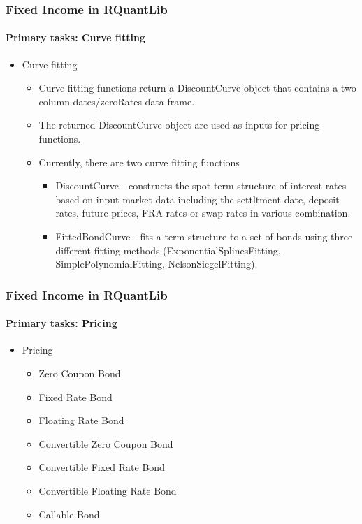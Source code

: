 \documentclass[smaller,compress]{beamer}
\begin{document}
\begin{frame}
	\frametitle{Fixed Income in RQuantLib}
	\framesubtitle{Primary tasks: Curve fitting}
	\begin{itemize}
		\item Curve fitting
			\begin{itemize}
				\item Curve fitting functions return a DiscountCurve object that contains a two column dates/zeroRates data frame.
				\item The returned DiscountCurve object are used as inputs for pricing functions. 
				\item Currently, there are two curve fitting functions
					\begin{itemize}
						\item DiscountCurve - constructs the spot term structure of interest rates based on input market data including the settltment date, deposit rates, future prices, FRA rates or swap rates in various combination.
						\item FittedBondCurve - fits a term structure to a set of bonds using three different fitting methods (ExponentialSplinesFitting, SimplePolynomialFitting, NelsonSiegelFitting).
					\end{itemize}
			\end{itemize}
	\end{itemize}
\end{frame}

\begin{frame}
	\frametitle{Fixed Income in RQuantLib}
	\framesubtitle{Primary tasks: Pricing}
	\begin{itemize}
		\item Pricing
			\begin{itemize}
				\item Zero Coupon Bond
				\item Fixed Rate Bond
				\item Floating Rate Bond
				\item Convertible Zero Coupon Bond
				\item Convertible Fixed Rate Bond												
				\item Convertible Floating Rate Bond
				\item Callable Bond
			\end{itemize}
	\end{itemize}
\end{frame}
\end{document}
